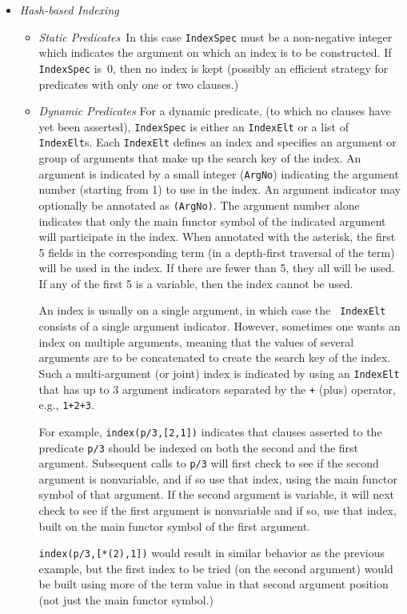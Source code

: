 \begin{description}
\begin{itemize}
\item {\em Hash-based Indexing} 
\begin{itemize}
\item {\em Static Predicates}\ 
In this case {\tt IndexSpec} must be a non-negative integer which
indicates the argument on which an index is to be constructed.  If
{\tt IndexSpec} is~0, then no index is kept (possibly an efficient
strategy for predicates with only one or two clauses.)
\item {\em Dynamic Predicates}
For a dynamic predicate, (to which no clauses have yet been asserted),
{\tt IndexSpec} is either an {\tt IndexElt} or a list of {\tt
IndexElt}s.  Each {\tt IndexElt} defines an index and specifies an argument or group of
arguments that make up the search key of the index.  An argument is
indicated by a small integer ({\tt ArgNo}) indicating the argument number (starting
from 1) to use in the index.  An argument indicator may optionally be annotated
as {\tt *(ArgNo)}.  The argument number alone indicates that only the
main functor symbol of the indicated argument will participate in the
index.  When annotated with the asterisk, the first 5 fields in the
corresponding term (in a depth-first traversal of the term) will be
used in the index.  If there are fewer than 5, they all will be used.
If any of the first 5 is a variable, then the index cannot be used.

An index is usually on a single argument, in which case the {\tt
IndexElt} consists of a single argument indicator.  However, sometimes
one wants an index on multiple arguments, meaning that the values of
several arguments are to be concatenated to create the search key of
the index.  Such a multi-argument (or joint) index is indicated by
using an {\tt IndexElt} that has up to 3 argument indicators separated
by the {\tt +} (plus) operator, e.g., {\tt 1+2+3}.

For example, {\tt index(p/3,[2,1])} indicates that clauses asserted to
the predicate {\tt p/3} should be indexed on both the second and the
first argument.  Subsequent calls to {\tt p/3} will first check to see
if the second argument is nonvariable, and if so use that index, using
the main functor symbol of that argument. If the second argument is
variable, it will next check to see if the first argument is
nonvariable and if so, use that index, built on the main functor
symbol of the first argument.  

{\tt index(p/3,[*(2),1])} would result in similar behavior as the
previous example, but the first index to be tried (on the second
argument) would be built using more of the term value in that second
argument position (not just the main functor symbol.)


\end{itemize}
\end{itemize}
\end{description}
